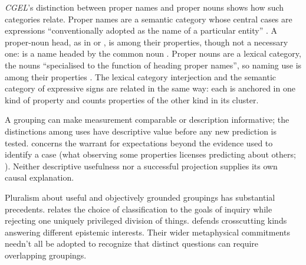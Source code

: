 \documentclass[12pt]{article}
\begin{document}
\textit{CGEL}'s distinction between proper names and proper nouns shows
how such categories relate. Proper names are a semantic category whose
central cases are expressions \enquote{conventionally adopted as the name
of a particular entity} \citep[515]{HuddlestonPullum2002}. A proper-noun
head, as in  or , is among their
properties, though not a necessary one:  is a name headed by the common noun .
Proper nouns are a lexical category, the nouns \enquote{specialised to the
function of heading proper names}, so naming use is among their properties
\citep[516]{HuddlestonPullum2002}. The lexical category interjection and the semantic category of expressive
signs are related in the same way: each is anchored in one kind of
property and counts properties of the other kind in its cluster.

A grouping can make measurement comparable or description informative;
the distinctions among  uses have descriptive value before
any new prediction is tested.  concerns the warrant
for expectations beyond the evidence used to identify a case (what
observing some properties licenses predicting about others;
\citealp{Goodman1955}). Neither descriptive usefulness nor a successful
projection supplies its own causal explanation.

Pluralism about useful and objectively grounded groupings has substantial
precedents. \textcite[5--7, 17--18]{dupre1993disorder} relates the choice of
classification to the goals of inquiry while rejecting one uniquely
privileged division of things. \textcite[63--64, 69--72]{khalidi2013}
defends crosscutting kinds answering different epistemic interests.
Their wider metaphysical commitments needn't all be adopted to recognize
that distinct questions can require overlapping groupings.
\end{document}
